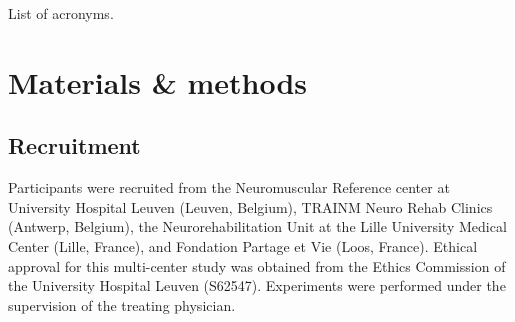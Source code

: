 \documentclass[twocolumn]{article}
\begin{document}
\begin{table}
	\footnotesize
	\printacronyms[template=tabular, heading=none]
	\caption{List of acronyms.}
\end{table}


\section{Materials \& methods}
\subsection{Recruitment}
Participants were recruited from the Neuromuscular Reference center at
University Hospital Leuven (Leuven, Belgium), TRAINM Neuro Rehab Clinics
(Antwerp, Belgium), the Neurorehabilitation Unit at the Lille University
Medical Center (Lille, France), and Fondation Partage et Vie (Loos,
France).
Ethical approval for this multi-center study was obtained from the Ethics
Commission of the University Hospital Leuven (S62547).
Experiments were performed under the supervision of the treating physician.
\end{document}
